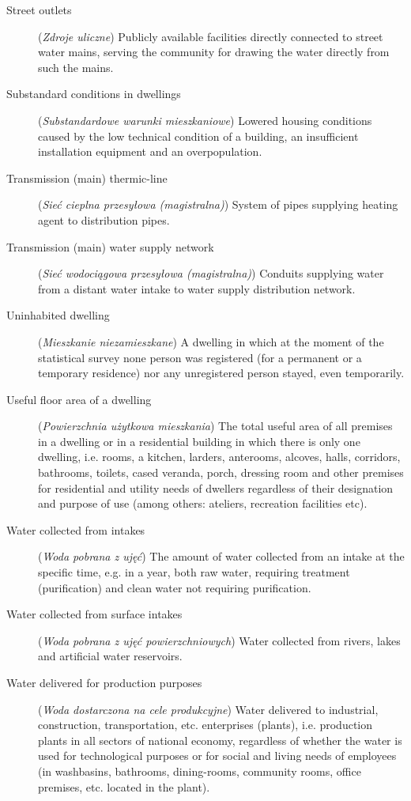 \documentclass[12pt,a4paper]{article}
\begin{document}
\begin{description}
\item[Street outlets] (\textit{Zdroje uliczne}) Publicly available facilities directly connected to street water mains, serving the community for drawing the water directly from such the mains.
\item[Substandard conditions in dwellings] (\textit{Substandardowe warunki mieszkaniowe}) Lowered housing conditions caused by the low technical condition of a building, an insufficient installation equipment and an overpopulation.
\item[Transmission (main) thermic-line] (\textit{Sieć cieplna przesyłowa (magistralna)}) System of pipes supplying heating agent to distribution pipes.
\item[Transmission (main) water supply network] (\textit{Sieć wodociągowa przesyłowa (magistralna)}) Conduits supplying water from a distant water intake to water supply distribution network.
\item[Uninhabited dwelling] (\textit{Mieszkanie niezamieszkane}) A dwelling in which at the moment of the statistical survey none person was registered (for a permanent or a temporary residence) nor any unregistered person stayed, even temporarily.
\item[Useful floor area of a dwelling] (\textit{Powierzchnia użytkowa mieszkania}) The total useful area of all premises in a dwelling or in a residential building in which there is only one dwelling, i.e. rooms, a kitchen, larders, anterooms, alcoves, halls, corridors, bathrooms, toilets, cased veranda, porch, dressing room and other premises for residential and utility needs of dwellers regardless of their designation and purpose of use (among others: ateliers, recreation facilities etc).
\item[Water collected from intakes] (\textit{Woda pobrana z ujęć}) The amount of water collected from an intake at the specific time, e.g. in a year, both raw water, requiring treatment (purification) and clean water not requiring purification.
\item[Water collected from surface intakes] (\textit{Woda pobrana z ujęć powierzchniowych}) Water collected from rivers, lakes and artificial water reservoirs.
\item[Water delivered for production purposes] (\textit{Woda dostarczona na cele produkcyjne}) Water delivered to industrial, construction, transportation, etc. enterprises (plants), i.e. production plants in all sectors of national economy, regardless of whether the water is used for technological purposes or for social and living needs of employees (in washbasins, bathrooms, dining-rooms, community rooms, office premises, etc. located in the plant).

\end{description}
\end{document}
